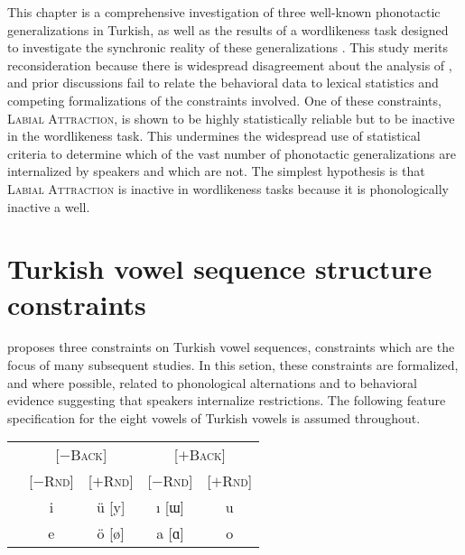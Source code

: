 This chapter is a comprehensive investigation of three well-known phonotactic generalizations in Turkish, as well as the results of a wordlikeness task designed to investigate the synchronic reality of these generalizations \citep{Zimmer1969}. This study merits reconsideration because there is widespread disagreement about the analysis of \citeauthor{Zimmer1969}, and prior discussions fail to relate the behavioral data to lexical statistics and competing formalizations of the constraints involved. One of these constraints, \textsc{Labial Attraction}, is shown to be highly statistically reliable but to be inactive in the wordlikeness task. This undermines the widespread use of statistical criteria to determine which of the vast number of phonotactic generalizations are internalized by speakers and which are not. The simplest hypothesis is that \textsc{Labial Attraction} is inactive in wordlikeness tasks because it is phonologically inactive a well.

\section{Turkish vowel sequence structure constraints}

\citet{Lees1966b,Lees1966a} proposes three constraints on Turkish vowel sequences, constraints which are the focus of many subsequent studies. In this setion, these constraints are formalized, and where possible, related to phonological alternations and to behavioral evidence suggesting that speakers internalize restrictions. The following feature specification for the eight vowels of Turkish vowels is assumed throughout.

\begin{example}
\begin{tabular}{c c c c c}
                       & \multicolumn{2}{c}{[$-$\textsc{Back}]} & \multicolumn{2}{c}{[$+$\textsc{Back}]} \\
                       & [$-$\textsc{Rnd}] & [$+$\textsc{Rnd}] & [$-$\textsc{Rnd}] & [$+$\textsc{Rnd}] \\ 
\cmidrule{2-5}
 & {i} & {ü} [y] & {ı} [ɯ] & {u} \\
 & {e} & {ö} [ø] & {a} [ɑ] & {o} \\
\end{tabular}
\end{example}

